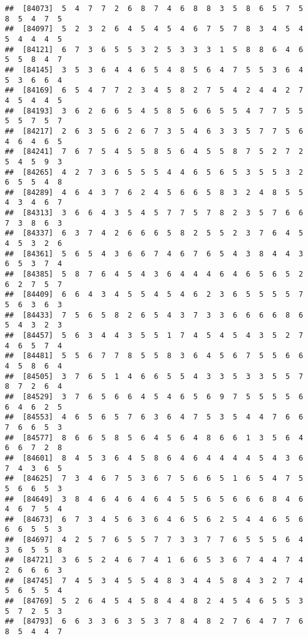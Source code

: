 \documentclass[
]{book}
\begin{document}
\begin{verbatim}
##  [84073]  5  4  7  7  2  6  8  7  4  6  8  8  3  5  8  6  5  7  5  8  5  4  7  5
##  [84097]  5  2  3  2  6  4  5  4  5  4  6  7  5  7  8  3  4  5  4  5  4  4  4  5
##  [84121]  6  7  3  6  5  5  3  2  5  3  3  3  1  5  8  8  6  4  6  5  5  8  4  7
##  [84145]  3  5  3  6  4  4  6  5  4  8  5  6  4  7  5  5  3  6  4  5  3  6  6  4
##  [84169]  6  5  4  7  7  2  3  4  5  8  2  7  5  4  2  4  4  2  7  4  5  4  4  5
##  [84193]  3  6  2  6  6  5  4  5  8  5  6  6  5  5  4  7  7  5  5  5  5  7  5  7
##  [84217]  2  6  3  5  6  2  6  7  3  5  4  6  3  3  5  7  7  5  6  4  6  4  6  5
##  [84241]  7  6  7  5  4  5  5  8  5  6  4  5  5  8  7  5  2  7  2  5  4  5  9  3
##  [84265]  4  2  7  3  6  5  5  5  4  4  6  5  6  5  3  5  5  3  2  6  5  5  4  8
##  [84289]  4  6  4  3  7  6  2  4  5  6  6  5  8  3  2  4  8  5  5  4  3  4  6  7
##  [84313]  3  6  6  4  3  5  4  5  7  7  5  7  8  2  3  5  7  6  6  7  3  8  6  3
##  [84337]  6  3  7  4  2  6  6  6  5  8  2  5  5  2  3  7  6  4  5  4  5  3  2  6
##  [84361]  5  6  5  4  3  6  6  7  4  6  7  6  5  4  3  8  4  4  3  6  5  3  7  4
##  [84385]  5  8  7  6  4  5  4  3  6  4  4  4  6  4  6  5  6  5  2  6  2  7  5  7
##  [84409]  6  6  4  3  4  5  5  4  5  4  6  2  3  6  5  5  5  5  7  5  6  3  6  3
##  [84433]  7  5  6  5  8  2  6  5  4  3  7  3  3  6  6  6  6  8  6  5  4  3  2  3
##  [84457]  5  6  3  4  4  3  5  5  1  7  4  5  4  5  4  3  5  2  7  4  6  5  7  4
##  [84481]  5  5  6  7  7  8  5  5  8  3  6  4  5  6  7  5  5  6  6  4  5  8  6  4
##  [84505]  3  7  6  5  1  4  6  6  5  5  4  3  3  5  3  3  5  5  7  8  7  2  6  4
##  [84529]  3  7  6  5  6  6  4  5  4  6  5  6  9  7  5  5  5  5  6  6  4  6  2  5
##  [84553]  4  6  5  6  5  7  6  3  6  4  7  5  3  5  4  4  7  6  6  7  6  6  5  3
##  [84577]  8  6  6  5  8  5  6  4  5  6  4  8  6  6  1  3  5  6  4  6  6  7  2  8
##  [84601]  8  4  5  3  6  4  5  8  6  4  6  4  4  4  4  5  4  3  6  7  4  3  6  5
##  [84625]  7  3  4  6  7  5  3  6  7  5  6  6  5  1  6  5  4  7  5  5  6  6  5  3
##  [84649]  3  8  4  6  4  6  4  6  4  5  5  6  5  6  6  6  8  4  6  4  6  7  5  4
##  [84673]  6  7  3  4  5  6  3  6  4  6  5  6  2  5  4  4  6  5  6  6  6  5  5  3
##  [84697]  4  2  5  7  6  5  5  7  7  3  3  7  7  6  5  5  5  6  4  3  6  5  5  8
##  [84721]  3  6  5  2  4  6  7  4  1  6  6  5  3  6  7  4  4  7  4  2  6  6  6  3
##  [84745]  7  4  5  3  4  5  5  4  8  3  4  4  5  8  4  3  2  7  4  5  6  5  5  4
##  [84769]  5  2  6  4  5  4  5  8  4  4  8  2  4  5  4  6  5  5  3  5  7  2  5  3
##  [84793]  6  6  3  3  6  3  5  3  7  8  4  8  2  7  6  4  7  7  6  8  5  4  4  7

\end{verbatim}
\end{document}
